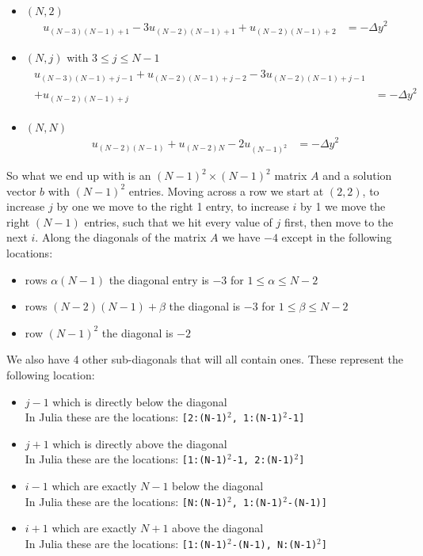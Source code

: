 \documentclass[10pt]{article}
\begin{document}
\begin{itemize}
\begin{align*}
\begin{split}
			\end{split}
		\end{align*}
		\item $ (N,2) $
		\begin{align*}
			u_{(N-3)(N-1)+1} - 3u_{(N-2)(N-1)+1} + u_{(N-2)(N-1)+2} &= -{\Delta y}^2
		\end{align*}
		\item $ (N,j) $ with $ 3\leq j\leq N-1 $
		\begin{align*}
			\begin{split}
				u_{(N-3)(N-1)+j-1} + u_{(N-2)(N-1)+j-2} - 3u_{(N-2)(N-1)+j-1}\\ + u_{(N-2)(N-1)+j} &= -{\Delta y}^2
			\end{split}
		\end{align*}
		\item $ (N,N) $
		\begin{align*}
			u_{(N-2)(N-1)} + u_{(N-2)N} - 2u_{(N-1)^2} &= -{\Delta y}^2
		\end{align*}
	\end{itemize}
	So what we end up with is an $ (N-1)^2\times(N-1)^2 $ matrix $ A $ and a solution vector $ b $ with $ (N-1)^2 $ entries. Moving across a row we start at $ (2,2) $, to increase $ j $ by one we move to the right 1 entry, to increase $ i $ by 1 we move the right $ (N-1) $ entries, such that we hit every value of $ j $ first, then move to the next $ i $.
	\newline\indent Along the diagonals of the matrix $ A $ we have $ -4 $ except in the following locations:
	\begin{itemize}
		\item rows $ \alpha(N-1) $ the diagonal entry is $ -3 $ for $ 1\leq \alpha\leq N-2 $
		\item rows $ \left(N-2\right)\left(N-1\right)+\beta $ the diagonal is $ -3 $ for $ 1\leq\beta\leq N-2 $
		\item row $ \left(N-1\right)^2 $ the diagonal is $ -2 $
	\end{itemize}
	We also have 4 other sub-diagonals that will all contain ones. These represent the following location:
	\begin{itemize}
		\item $ j-1 $ which is directly below the diagonal\\
		In Julia these are the locations: \texttt{[2:(N-1)$^2$, 1:(N-1)$^2$-1]}
		\item $ j+1 $ which is directly above the diagonal\\
		In Julia these are the locations: \texttt{[1:(N-1)$^2$-1, 2:(N-1)$^2$]}
		\item $ i-1 $ which are exactly $ N-1 $ below the diagonal\\
		In Julia these are the locations: \texttt{[N:(N-1)$^2$, 1:(N-1)$^2$-(N-1)]}
		\item $ i+1 $ which are exactly $ N+1 $ above the diagonal\\
		In Julia these are the locations: \texttt{[1:(N-1)$^2$-(N-1), N:(N-1)$^2$]}
	\end{itemize}
\end{document}
